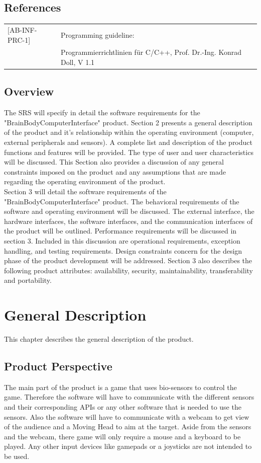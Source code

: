 \documentclass[a4paper]{scrreprt}
\begin{document}
\section{References}
\begin{longtable}{l l}
	[AB-INF-PRC-1] & Programming guideline:\\
				   & Programmierrichtlinien für C/C++, Prof. Dr.-Ing. Konrad Doll, V 1.1\\
\end{longtable}

\section{Overview}
The SRS will specify in detail the software requirements for the "BrainBodyComputerInterface" product. 
Section 2 presents a general description of the product and it’s relationship within the operating environment (computer, external peripherals and sensors).
A complete list and description of the product functions and features will be provided. 
The type of user and user characteristics will be discussed. 
This Section also provides a discussion of any general constraints imposed on the product 
and any assumptions that are made regarding the operating environment of the product. \\

Section 3 will detail the software requirements of the "BrainBodyComputerInterface" product. 
The behavioral requirements of the software and operating environment will be discussed.
The external interface, the hardware interfaces, the software interfaces, and the
communication interfaces of the product will be outlined. 
Performance requirements will be discussed in section 3. 
Included in this discussion are operational requirements, exception handling, and testing requirements. 
Design constraints concern for the design phase of the product development will be addressed. 
Section 3 also describes the following product attributes: availability, security, maintainability, transferability and portability.

\chapter{General Description}
This chapter describes the general description of the product.

\section{Product Perspective}
The main part of the product is a game that uses bio-sensors to control the game.
Therefore the software will have to communicate with the different sensors and their corresponding 
APIs or any other software that is needed to use the sensors.
Also the software will have to communicate with a webcam to get view of the audience and a Moving Head to aim at the target.
Aside from the sensors and the webcam, there game will only require a mouse and a keyboard to be played.
Any other input devices like gamepads or a joysticks are not intended to be used.
\end{document}

